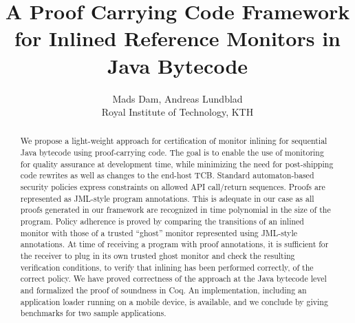 \documentclass[10pt,twocolumn]{article}
\begin{document}
\title{A Proof Carrying Code Framework for Inlined Reference Monitors in Java Bytecode}

\author{Mads Dam, Andreas Lundblad\\Royal Institute of Technology, KTH}

\maketitle

\begin{abstract}
We propose a light-weight approach for certification of monitor inlining 
for sequential Java bytecode using proof-carrying code. The goal is to 
enable the use of monitoring for quality assurance at development time, 
while minimizing the need for post-shipping code rewrites as well as 
changes to the end-host TCB. Standard automaton-based security policies 
express constraints on allowed API call/return sequences. Proofs are
represented as JML-style program annotations. This is adequate in our
case as all proofs generated in our framework are recognized in time
polynomial in the size of the program. Policy adherence is proved
by comparing the transitions of an inlined monitor with those of a 
trusted ``ghost'' monitor represented using JML-style annotations.
At time of receiving a 
program with proof annotations, it is sufficient for the receiver to plug 
in its own trusted ghost monitor and check the resulting verification 
conditions, to verify that inlining has been  performed correctly, of the 
correct policy. We have proved correctness of the approach at the Java 
bytecode level and formalized the proof of soundness in Coq. An
implementation, including an application loader running on a mobile device, 
is available, and we conclude by giving benchmarks for two sample applications.
\end{abstract}
\end{document}
